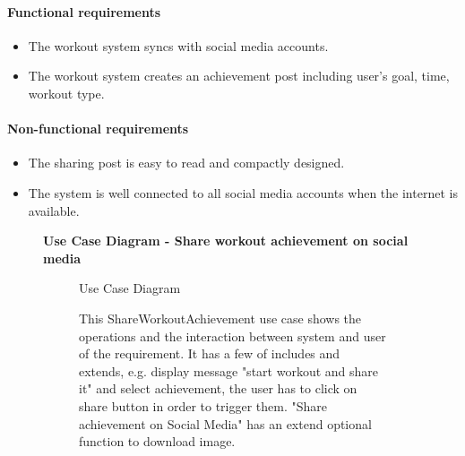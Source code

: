 \documentclass{article}
\begin{document}
		\paragraph{Functional requirements}

		\begin{itemize}
			\item{The workout system syncs with social media accounts.}
			\item{The workout system creates an achievement post including user's goal, time, workout type.}
		\end{itemize}
		
		\paragraph{Non-functional requirements}
		
		\begin{itemize}
			\item{The sharing post is easy to read and compactly designed.}
			\item{The system is well connected to all social media accounts when the internet is available.}
		\end{itemize}
		
		\clearpage

	\begin{figure}[htbp]
		\textbf{Use Case Diagram - Share workout achievement on social media }
		\centering
		\begin{subfigure}{\textwidth}
			\resizebox{\textwidth}{!}{}
			\caption{Use Case Diagram}
		\end{subfigure}
		\begin{subfigure}{\textwidth}
			This ShareWorkoutAchievement use case shows the operations and the interaction between system and user
			of the requirement. It has a few of includes and extends, e.g. display message "start workout and share it" and
			select achievement, the user has to click on share button in order to trigger them. "Share achievement on Social Media" has an extend
			optional function to download image. 
		\end{subfigure}
	\end{figure}

	\clearpage
\end{document}
